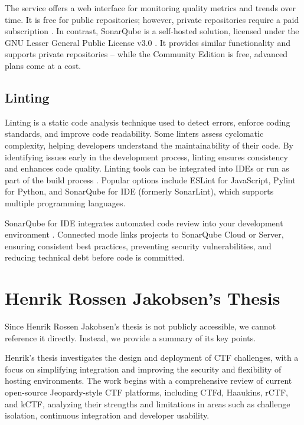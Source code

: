 The service offers a web interface for monitoring quality metrics and trends over time. It is free for public repositories; however, private repositories require a paid subscription \cite{SonarCloudPricing2025}. In contrast, SonarQube is a self-hosted solution, licensed under the GNU Lesser General Public License v3.0 \cite{SonarQubeLicense2025}. It provides similar functionality and supports private repositories -- while the Community Edition is free, advanced plans come at a cost.

\subsection{Linting}
Linting is a static code analysis technique used to detect errors, enforce coding standards, and improve code readability. Some linters assess cyclomatic complexity, helping developers understand the maintainability of their code. By identifying issues early in the development process, linting ensures consistency and enhances code quality. Linting tools can be integrated into IDEs or run as part of the build process \cite{SuperLinter2025}. Popular options include ESLint for JavaScript, Pylint for Python, and SonarQube for IDE (formerly SonarLint), which supports multiple programming languages.

SonarQube for IDE integrates automated code review into your development environment \cite{SonarQubeConnectedMode2025}. Connected mode links projects to SonarQube Cloud or Server, ensuring consistent best practices, preventing security vulnerabilities, and reducing technical debt before code is committed.

\section{Henrik Rossen Jakobsen's Thesis}\label{sec:henrik_thesis}
Since Henrik Rossen Jakobsen's thesis is not publicly accessible, we cannot reference it directly. Instead, we provide a summary of its key points.

Henrik's thesis investigates the design and deployment of CTF challenges, with a focus on simplifying integration and improving the security and flexibility of hosting environments. The work begins with a comprehensive review of current open-source Jeopardy-style CTF platforms, including CTFd, Haaukins, rCTF, and kCTF, analyzing their strengths and limitations in areas such as challenge isolation, continuous integration and developer usability. 

